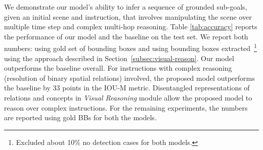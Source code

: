 We demonstrate our model's ability to infer a sequence of grounded sub-goals, given an initial scene and instruction, that involves manipulating the scene over multiple time step and complex multi-hop reasoning.
%
Table \ref{tab:accuracy} reports the performance of our model and the baseline on the test set. We report both numbers: using gold set of bounding boxes and using bounding boxes extracted~\footnote{Excluded about 10\% no detection cases for both models.} using the approach described in Section~\ref{subsec:visual-reason}. Our model outperforms the baseline overall. For instructions with complex reasoning (resolution of binary spatial relations) involved, the proposed model outperforms the baseline by $33$ points in the IOU-M metric.
%
Disentangled representations of relations and concepts in \textit{Visual Reasoning} module allow the proposed model to reason over complex instructions. For the remaining experiments, the numbers are reported using gold BBs for both the models.
%


